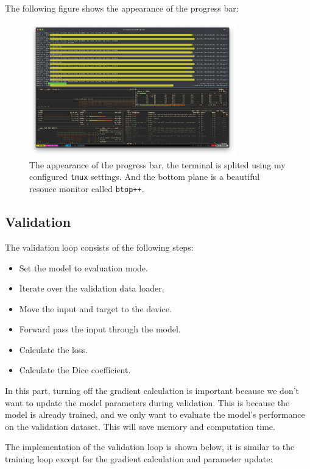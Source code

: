 The following figure shows the appearance of the progress bar:
\begin{figure}[H]
    \centering
    \includegraphics[width=0.8\textwidth]{./images/tqdm.png}
    \caption{The appearance of the progress bar, the terminal is splited using my configured \texttt{tmux} settings. And the bottom plane is a beautiful resouce monitor called \texttt{btop++}.}
\end{figure}

\subsection{Validation}

The validation loop consists of the following steps:
\begin{itemize}
    \item Set the model to evaluation mode.
    \item Iterate over the validation data loader.
    \item Move the input and target to the device.
    \item Forward pass the input through the model.
    \item Calculate the loss.
    \item Calculate the Dice coefficient.
\end{itemize}

In this part, turning off the gradient calculation is important because we don't want to update the model parameters during validation.
This is because the model is already trained, and we only want to evaluate the model's performance on the validation dataset.
This will save memory and computation time.

The implementation of the validation loop is shown below, it is similar to the training loop except for the gradient calculation and parameter update:

